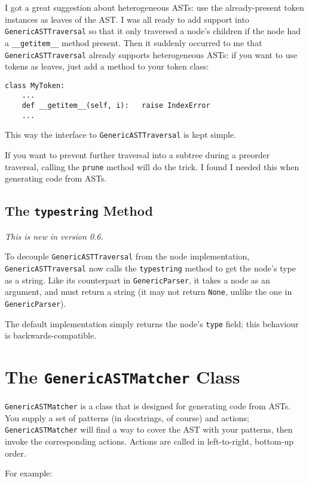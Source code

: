 \documentclass{article}
\newcommand{\code}[1]{\texttt{#1}}
\begin{document}
I got a great suggestion about heterogeneous ASTs: use the already-present
token instances as leaves of the AST.  I was all ready to add support
into \code{GenericASTTraversal} so that it only traversed a node's children
if the node had a \code{\_\_getitem\_\_} method present.  Then it
suddenly occurred to me that \code{GenericASTTraversal} already supports
heterogeneous ASTs: if you want to use tokens as leaves, just add a
method to your token class:
\begin{verbatim}
class MyToken:
    ...
    def __getitem__(self, i):	raise IndexError
    ...
\end{verbatim}
This way the interface to \code{GenericASTTraversal} is kept simple.

If you want to prevent further traversal into a subtree during a
preorder traversal, calling the \code{prune} method will do the trick.  I
found I needed this when generating code from ASTs.

\subsection{The \code{typestring} Method}

\emph{This is new in version 0.6.}

To decouple \code{GenericASTTraversal} from the node implementation,
\code{GenericASTTraversal} now calls the \code{typestring} method to
get the node's type as a string.  Like its counterpart in \code{GenericParser},
it takes a node as an argument, and must return a string (it may not return
\code{None}, unlike the one in \code{GenericParser}).

The default implementation simply returns the node's \code{type} field; this
behaviour is backwards-compatible.

\section{The \code{GenericASTMatcher} Class}

\code{GenericASTMatcher} is a class that is designed for generating code
from ASTs.  You supply a set of patterns (in docstrings, of course) and
actions; \code{GenericASTMatcher} will find a way to cover the AST with
your patterns, then invoke the corresponding actions.  Actions are called
in left-to-right, bottom-up order.

For example:
\end{document}
